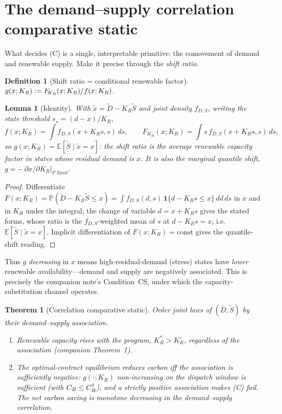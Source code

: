 \documentclass[11pt,reqno]{amsart}
\theoremstyle{plain}
\newtheorem{theorem}{Theorem}
\newtheorem{lemma}{Lemma}
\theoremstyle{definition}
\newtheorem{definition}{Definition}
\theoremstyle{remark}
\newcommand{\KR}{K_R}\newcommand{\KF}{K_F}\newcommand{\KM}{K_M}
\newcommand{\KRs}{K_R^{*}}\newcommand{\KFs}{K_F^{*}}\newcommand{\KMs}{K_M^{*}}
\newcommand{\KRo}{K_R^{\circ}}\newcommand{\KFo}{K_F^{\circ}}
\newcommand{\FKR}{F_{\!\KR}}
\newcommand{\E}{\mathbb{E}}\newcommand{\PP}{\mathbb{P}}
\newcommand{\eqdef}{\vcentcolon=}
\begin{document}
\section{The demand--supply correlation comparative static}\label{sec:corr}

What decides (C) is a single, interpretable primitive: the comovement of demand
and renewable supply. Make it precise through the \emph{shift ratio}.

\begin{definition}[Shift ratio = conditional renewable factor]\label{def:g}
$g(x;\KR)\eqdef \FKR(x;\KR)/f(x;\KR)$.
\end{definition}

\begin{lemma}[Identity]\label{lem:g}
With $\tilde x=\tilde D-\KR\tilde S$ and joint density $f_{D,S}$, writing the
state threshold $s_\star=(d-x)/\KR$,
\[
  f(x;\KR)=\!\int\! f_{D,S}(x+\KR s,s)\,ds,
  \qquad
  \FKR(x;\KR)=\!\int\! s\,f_{D,S}(x+\KR s,s)\,ds,
\]
so $g(x;\KR)=\E[\tilde S\mid \tilde x = x]$: the shift ratio is the
\emph{average renewable capacity factor in states whose residual demand is $x$}.
It is also the marginal quantile shift, $g=-\,\partial x/\partial\KR|_{F\text{ fixed}}$.
\end{lemma}

\begin{proof}
Differentiate $F(x;\KR)=\PP(\tilde D-\KR\tilde S\le x)
=\int f_{D,S}(d,s)\,\mathbf 1\{d-\KR s\le x\}\,dd\,ds$ in $x$ and in $\KR$ under
the integral; the change of variable $d=x+\KR s$ gives the stated forms, whose
ratio is the $f_{D,S}$-weighted mean of $s$ at $d-\KR s=x$, i.e.\
$\E[\tilde S\mid\tilde x=x]$. Implicit differentiation of $F(x;\KR)=\text{const}$
gives the quantile-shift reading.
\end{proof}

Thus $g$ \emph{decreasing} in $x$ means high-residual-demand (stress) states have
\emph{lower} renewable availability---demand and supply are negatively
associated. This is precisely the companion note's Condition~CS, under which the
capacity-substitution channel operates.

\begin{theorem}[Correlation comparative static]\label{thm:corr}
Order joint laws of $(\tilde D,\tilde S)$ by their demand--supply association.
\begin{enumerate}[label=(\roman*),leftmargin=2.2em]
  \item Renewable capacity rises with the program, $\KRs>\KRo$, \emph{regardless}
        of the association (companion Theorem~1).
  \item The optimal-contract equilibrium reduces carbon iff the association is
        sufficiently negative: $g(\cdot;\KR)$ non-increasing on the dispatch
        window is sufficient (with $C_R\le C_R^{\dagger}$), and a strictly positive
        association makes (C) fail. The net carbon saving is monotone decreasing
        in the demand--supply correlation.
\end{enumerate}
\end{theorem}
\end{document}
